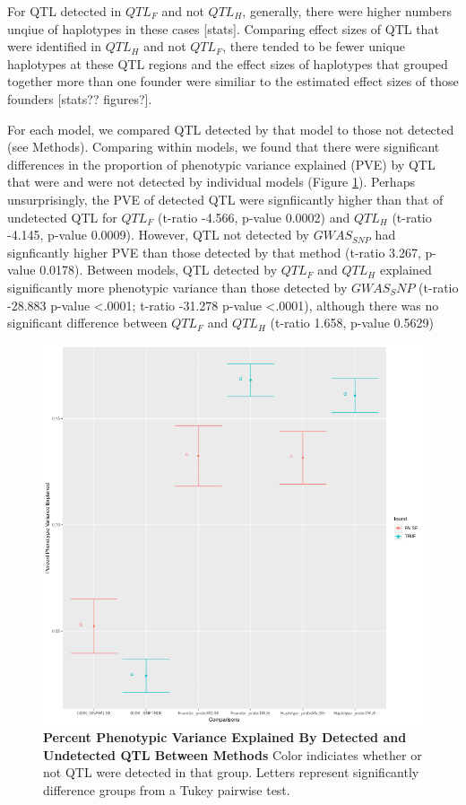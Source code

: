 \documentclass[article,9pt,twocolumn,twoside]{rilabRxiv}
\begin{document}
For QTL detected in $QTL_F$ and not $QTL_H$, generally, there were higher numbers unqiue of haplotypes in these cases [stats].
Comparing effect sizes of QTL that were identified in $QTL_H$ and not $QTL_F$, there tended to be fewer unique haplotypes at these QTL regions and the effect sizes of haplotypes that grouped together more than one founder were similiar to the estimated effect sizes of those founders [stats?? figures?].

For each model, we compared QTL detected by that model to those not detected (see Methods).
Comparing within models, we found that there were significant differences in the proportion of phenotypic variance explained (PVE) by QTL that were and were not detected by individual models (Figure \ref{fig:pvefigure}).
Perhaps unsurprisingly, the PVE of detected QTL were signfiicantly higher than that of undetected QTL for $QTL_F$ (t-ratio -4.566, p-value 0.0002) and  $QTL_H$ (t-ratio -4.145, p-value 0.0009).
However, QTL not detected by $GWAS_{SNP}$ had signficantly higher PVE than those detected by that method (t-ratio 3.267, p-value 0.0178).
Between models, QTL detected by $QTL_F$ and $QTL_H$ explained significantly more phenotypic variance than those detected by $GWAS_SNP$ (t-ratio -28.883 p-value <.0001; t-ratio -31.278 p-value <.0001), although there was no significant difference between $QTL_F$ and $QTL_H$ (t-ratio 1.658, p-value 0.5629)

\begin{figure}[ht]
\includegraphics[width=\linewidth]{figures/pve_contrasts.png}
\caption{\textbf{Percent Phenotypic Variance Explained By Detected and Undetected QTL Between Methods} Color indiciates whether or not QTL were detected in that group. Letters represent significantly difference groups from a Tukey pairwise test.}
\label{fig:pvefigure}
\end{figure}
\end{document}
